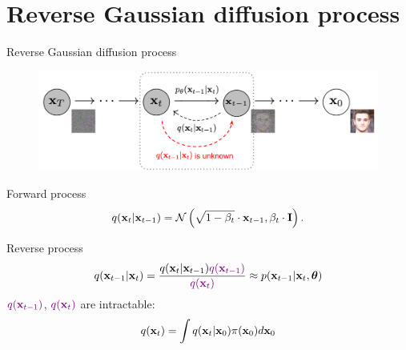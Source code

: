 \section{Reverse Gaussian diffusion process}
\begin{frame}{Reverse Gaussian diffusion process}
	\begin{figure}
		\includegraphics[width=0.8\linewidth]{figs/DDPM}
	\end{figure}
	\vspace{-0.5cm}
	\begin{block}{Forward process}
		\vspace{-0.3cm}
		\[
			q(\mathbf{x}_t | \mathbf{x}_{t-1}) = \mathcal{N}\left(\sqrt{1 - \beta_t} \cdot \mathbf{x}_{t-1}, \beta_t \cdot \mathbf{I}\right).
		\]
		\vspace{-0.5cm}
	\end{block}
	\begin{block}{Reverse process}
		\vspace{-0.3cm}
		\[
			q(\mathbf{x}_{t-1}|\mathbf{x}_{t}) = \frac{q(\mathbf{x}_{t}|\mathbf{x}_{t-1}) {\color{violet}q(\mathbf{x}_{t-1})}}{{\color{violet}q(\mathbf{x}_{t})}} \approx p(\mathbf{x}_{t - 1} | \mathbf{x}_t, \boldsymbol{\theta})
		\]
		\vspace{-0.3cm}
		${\color{violet}q(\mathbf{x}_{t-1})}$, ${\color{violet}q(\mathbf{x}_{t})}$ are intractable:		
		\[
			q(\mathbf{x}_{t}) = \int q(\mathbf{x}_{t} | \mathbf{x}_0) \pi(\mathbf{x}_0) d\mathbf{x}_0
		\]
	\end{block}
\end{frame}
